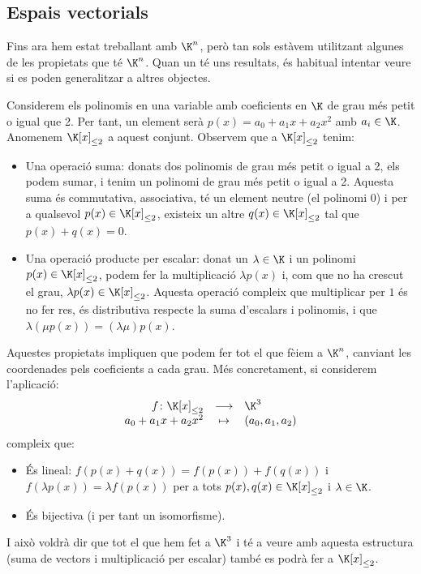 \subsection{Espais vectorials}
Fins ara hem estat treballant amb $\K^n$, però tan sols estàvem utilitzant algunes de les propietats que té $\K^n$. Quan un té uns resultats, és habitual intentar veure si es poden generalitzar a altres objectes.
\begin{exemple}
    Considerem els polinomis en una variable amb coeficients en $\K$ de grau més petit o igual que 2. Per tant, un element serà $p(x)=a_0+a_1x+a_2x^2$ amb $a_i\in \K$. Anomenem $\K[x]_{\leq2}$ a aquest conjunt. Observem que a $\K[x]_{\leq2}$ tenim:
    \begin{itemize}
        \item Una operació suma: donats dos polinomis de grau més petit o igual a 2, els podem sumar, i tenim un polinomi de grau més petit o igual a 2. Aquesta suma és commutativa, associativa, té un element neutre (el polinomi 0) i per a qualsevol $p(x)\in\K[x]_{\leq2}$, existeix un altre $q(x)\in\K[x]_{\leq2}$ tal que $p(x)+q(x)=0$.
        \item Una operació producte per escalar: donat un $\lambda \in \K$ i un polinomi $p(x)\in\K[x]_{\leq2}$, podem fer la multiplicació $\lambda p(x)$ i, com que no ha crescut el grau, $\lambda p(x)\in\K[x]_{\leq2}$. Aquesta operació compleix que multiplicar per $1$ és no fer res, és distributiva respecte la suma d'escalars i polinomis, i que $\lambda(\mu p(x))=(\lambda\mu)p(x)$.
    \end{itemize}
    Aquestes propietats impliquen que podem fer tot el que fèiem a $\K^n$, canviant les coordenades pels coeficients a cada grau. Més concretament, si considerem l'aplicació:
    $$
    \begin{array}{rcl}
 f\colon \K[x]_{\leq2} & \longrightarrow & \K^3 \\
     a_0+a_1x+a_2x^2 & \mapsto & (a_0,a_1,a_2)
    \end{array}
    $$
    compleix que:
    \begin{itemize}
        \item És lineal: $f(p(x)+q(x))=f(p(x))+f(q(x))$ i $f(\lambda p(x))=\lambda f(p(x))$ per a tots $p(x),q(x)\in \K[x]_{\leq2}$ i $\lambda \in \K$.
        \item És bijectiva (i per tant un isomorfisme).
    \end{itemize}
    I això voldrà dir que tot el que hem fet a $\K^3$ i té a veure amb aquesta estructura (suma de vectors i multiplicació per escalar) també es podrà fer a $\K[x]_{\leq2}$.
\end{exemple}
